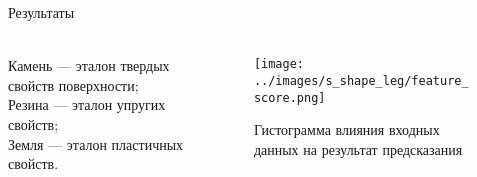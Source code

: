 \begin{frame}[t]{Результаты}
    \framesubtitle{}
    \begin{columns}[T,onlytextwidth]
        \begin{column}{0.49\textwidth}
            \begin{table}[H]
                \caption{Результаты обученного классификатора опорных поверхностей}
            \end{table}

            Камень --- эталон твердых свойств поверхности;\\
            Резина --- эталон упругих свойств;\\
            Земля --- эталон пластичных свойств.
        \end{column}
        \begin{column}{0.49\textwidth}
            \begin{figure}[H]
                \centering\texttt{[image: ../images/s\_shape\_leg/feature\_score.png]}
                \caption*{Гистограмма влияния входных данных на результат предсказания}
            \end{figure}
        \end{column}
    \end{columns}
\end{frame}

